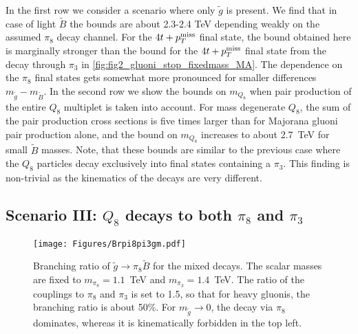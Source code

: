 \documentclass[preprintnumbers,nofootinbib,showpacs,eqsecnum,pre,12pt]{revtex4-1}
\def\ptmiss{p_{T}^{\rm miss}}
\begin{document}
In the first row we consider a scenario where
only $\tilde g$ is present. We find that
in case of light $\tilde B$ the bounds are about 
2.3-2.4 TeV depending weakly on the assumed $\pi_8$ decay channel. For the $4t + \ptmiss$ final state, the bound obtained here is marginally stronger than the bound for the $4t + \ptmiss$ final state from the decay through $\pi_3$ in \cref{fig:fig2_gluoni_stop_fixedmass_MA}.
The dependence on the $\pi_8$ final states gets somewhat more pronounced for smaller differences
$m_{\tilde g}-m_{\tilde B}$. 
In the second row we show the bounds on $m_{Q_8}$ when pair production of the entire $Q_8$ multiplet is taken into account. For mass degenerate $Q_8$, the sum of the pair production cross sections is five times larger than for Majorana gluoni pair production alone, and the bound on $m_{Q_8}$ increases to about 2.7~TeV for small $\tilde B$ masses. Note, that these bounds are similar to the previous case where the $Q_8$ particles decay exclusively into final states containing a $\pi_3$. This finding is non-trivial as the kinematics of the decays are very different.


\subsection{Scenario III: $Q_8$ decays to both $\pi_8$ and $\pi_3$} 

\begin{figure}
	\centering
	\texttt{[image: Figures/Brpi8pi3gm.pdf]}
	\caption{Branching ratio of $\tilde g\to \pi_8 \tilde B$ for the mixed decays. 
	The scalar masses are fixed to $m_{\pi_8}=1.1$~TeV and $m_{\pi_3}=1.4$~TeV. The ratio of the couplings to $\pi_8$ and $\pi_3$ is set to 1.5, so that for heavy gluonis, the branching ratio is about 50\%. For $m_{\tilde g}\to0$, the decay via $\pi_8$ dominates, whereas it is kinematically forbidden in the top left.}
	\label{fig:Brpi8pi3}
\end{figure}
\end{document}
